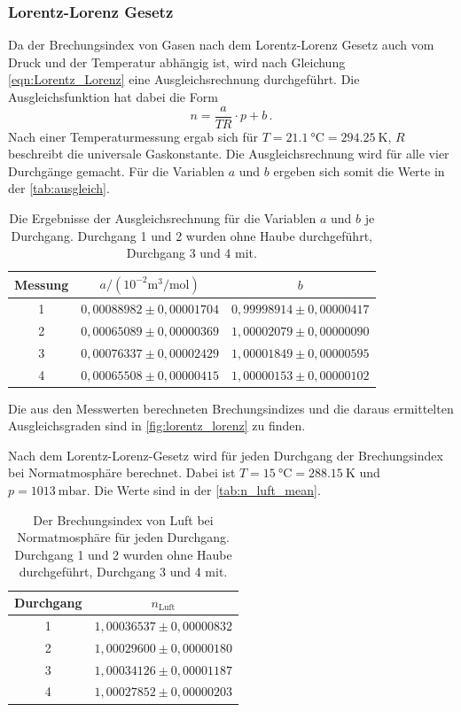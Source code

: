 \subsubsection{Lorentz-Lorenz Gesetz}
Da der Brechungsindex von Gasen nach dem Lorentz-Lorenz Gesetz auch vom Druck und  der Temperatur abhängig ist, wird nach Gleichung \eqref{eqn:Lorentz_Lorenz} eine Ausgleichsrechnung durchgeführt.
Die Ausgleichsfunktion hat dabei die Form
\begin{equation*}
  n = \frac{a}{TR} \cdot p + b \, .
\end{equation*}
Nach einer Temperaturmessung ergab sich für $T = \SI{21.1}{\celsius} = \SI{294.25}{\kelvin}$, $R$ beschreibt die universale Gaskonstante.
Die Ausgleichsrechnung wird für alle vier Durchgänge gemacht.
Für die Variablen $a$ und $b$ ergeben sich somit die Werte in der \autoref{tab:ausgleich}. 
\begin{table}[H]
  \centering
  \caption{Die Ergebnisse der Ausgleichsrechnung für die Variablen $a$ und $b$ je Durchgang. Durchgang 1 und 2 wurden ohne Haube durchgeführt, Durchgang 3 und 4 mit.}
  \label{tab:ausgleich} 
  \begin{tabular}{c c c}
    \toprule
    Messung & $a / \left(10^{-2} \si{\cubic\metre\per\mole} \right)$ & $b$ \\
    \midrule
    1    &  $0,00088982 \pm 0,00001704$ & $0,99998914 \pm 0,00000417$ \\   
    2    &  $0,00065089 \pm 0,00000369$ & $1,00002079 \pm 0,00000090$ \\   
    3    &  $0,00076337 \pm 0,00002429$ & $1,00001849 \pm 0,00000595$ \\   
    4    &  $0,00065508 \pm 0,00000415$ & $1,00000153 \pm 0,00000102$ \\
    \bottomrule
  \end{tabular}
\end{table}
\noindent
Die aus den Messwerten berechneten Brechungsindizes und die daraus ermittelten Ausgleichsgraden sind in \autoref{fig:lorentz_lorenz} zu finden.

\noindent Nach dem Lorentz-Lorenz-Gesetz wird für jeden Durchgang der Brechungsindex bei Normatmosphäre berechnet. Dabei ist 
$T = \SI{15}{\celsius} = \SI{288.15}{\kelvin}$ und $p = \SI{1013}{\milli\bar}$. Die Werte sind in der \autoref{tab:n_luft_mean}. 

\begin{table}[H]
  \centering
  \caption{Der Brechungsindex von Luft  bei Normatmosphäre für jeden Durchgang. Durchgang 1 und 2 wurden ohne Haube durchgeführt, Durchgang 3 und 4 mit.}
  \label{tab:n_luft_mean}
  \begin{tabular}{c c}
    \toprule
    Durchgang & $n_\text{Luft}$ \\
    \midrule
    1    &  $1,00036537 \pm 0,00000832$ \\   
    2    &  $1,00029600 \pm 0,00000180$ \\   
    3    &  $1,00034126 \pm 0,00001187$ \\   
    4    &  $1,00027852 \pm 0,00000203$ \\   
    \bottomrule
  \end{tabular}
\end{table}

